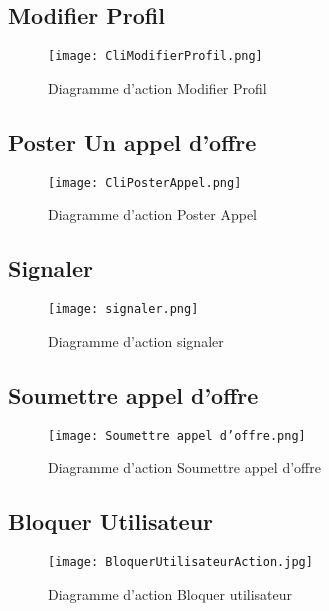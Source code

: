 \subsection{Modifier Profil}

\begin{figure}[H]
	\centering
	\texttt{[image: CliModifierProfil.png]}
	\caption{Diagramme d'action Modifier Profil}
	\label{fig:action modifier profil}
\end{figure}

\subsection{Poster Un appel d'offre}

\begin{figure}[H]
	\centering
	\texttt{[image: CliPosterAppel.png]}
	\caption{Diagramme d'action Poster Appel}
	\label{fig:action poster appel}
\end{figure}

\subsection{Signaler}

\begin{figure}[H]
	\centering
	\texttt{[image: signaler.png]}
	\caption{Diagramme d'action signaler}
	\label{fig:action signaler}
\end{figure}

\subsection{Soumettre appel d’offre}

\begin{figure}[H]
	\centering
	\texttt{[image: Soumettre appel d'offre.png]}
	\caption{Diagramme d'action Soumettre appel d'offre}
	\label{fig:action soumettre appel d'offre}
\end{figure}

\subsection{Bloquer Utilisateur}

\begin{figure}[H]
	\centering
	\texttt{[image: BloquerUtilisateurAction.jpg]}
	\caption{Diagramme d'action Bloquer utilisateur}
	\label{fig:action bloquer user}
\end{figure}

